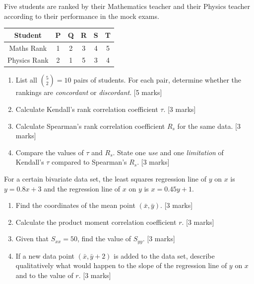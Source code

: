 \documentclass[11pt]{article}
\begin{document}
\begin{exercice}
Five students are ranked by their Mathematics teacher and their Physics teacher according to their performance in the mock exams.

\begin{center}
\begin{tabular}{|c|c|c|c|c|c|}
\hline
Student & P & Q & R & S & T \\
\hline
Maths Rank & 1 & 2 & 3 & 4 & 5 \\
\hline
Physics Rank & 2 & 1 & 5 & 3 & 4 \\
\hline
\end{tabular}
\end{center}

\begin{enumerate}
    \item List all $\binom{5}{2} = 10$ pairs of students. For each pair, determine whether the rankings are \emph{concordant} or \emph{discordant}. \hfill [5 marks]
    \item Calculate Kendall's rank correlation coefficient $\tau$. \hfill [3 marks]
    \item Calculate Spearman's rank correlation coefficient $R_s$ for the same data. \hfill [3 marks]
    \item Compare the values of $\tau$ and $R_s$. State one \emph{use} and one \emph{limitation} of Kendall's $\tau$ compared to Spearman's $R_s$. \hfill [3 marks]
\end{enumerate}
\end{exercice}

\begin{exercice}
For a certain bivariate data set, the least squares regression line of $y$ on $x$ is $y = 0.8x + 3$ and the regression line of $x$ on $y$ is $x = 0.45y + 1$.

\begin{enumerate}
    \item Find the coordinates of the mean point $(\bar{x}, \bar{y})$. \hfill [3 marks]
    \item Calculate the product moment correlation coefficient $r$. \hfill [3 marks]
    \item Given that $S_{xx} = 50$, find the value of $S_{yy}$. \hfill [3 marks]
    \item If a new data point $(\bar{x}, \bar{y} + 2)$ is added to the data set, describe qualitatively what would happen to the slope of the regression line of $y$ on $x$ and to the value of $r$. \hfill [3 marks]
\end{enumerate}
\end{exercice}
\end{document}

